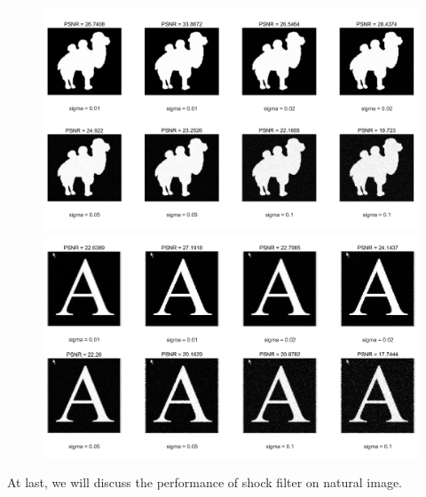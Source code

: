 \documentclass{article}
\begin{document}
\begin{figure}[H]
\begin{center}
\includegraphics[scale=.36]{7.png}
\includegraphics[scale=.36]{8.png}
\end{center}
\end{figure}

At last, we will discuss the performance of shock filter on natural image.
\end{document}
